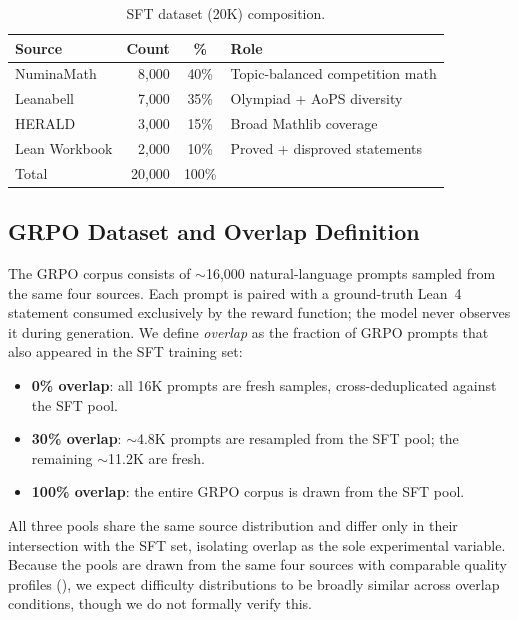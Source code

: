 \documentclass[11pt,a4paper]{article}
\begin{document}
\begin{table}[t]
\centering
\caption{SFT dataset (20K) composition.}
\label{tab:sft_mix}
\begin{tabular}{@{}lrcl@{}}
\toprule
\textbf{Source} & \textbf{Count} & \textbf{\%} & \textbf{Role} \\
\midrule
NuminaMath & 8{,}000 & 40\% & Topic-balanced competition math \\
Leanabell & 7{,}000 & 35\% & Olympiad + AoPS diversity \\
HERALD & 3{,}000 & 15\% & Broad Mathlib coverage \\
Lean Workbook & 2{,}000 & 10\% & Proved + disproved statements \\
\midrule
Total & 20{,}000 & 100\% & \\
\bottomrule
\end{tabular}
\end{table}

\subsection{GRPO Dataset and Overlap Definition}\label{sec:grpo_data}

The GRPO corpus consists of ${\sim}$16{,}000 natural-language prompts sampled from the same four sources. Each prompt is paired with a ground-truth Lean~4 statement consumed exclusively by the reward function; the model never observes it during generation. We define \emph{overlap} as the fraction of GRPO prompts that also appeared in the SFT training set:

\begin{itemize}[leftmargin=*, itemsep=2pt]
  \item \textbf{0\% overlap}: all 16K prompts are fresh samples, cross-deduplicated against the SFT pool.
  \item \textbf{30\% overlap}: ${\sim}$4.8K prompts are resampled from the SFT pool; the remaining ${\sim}$11.2K are fresh.
  \item \textbf{100\% overlap}: the entire GRPO corpus is drawn from the SFT pool.
\end{itemize}

All three pools share the same source distribution and differ only in their intersection with the SFT set, isolating overlap as the sole experimental variable. Because the pools are drawn from the same four sources with comparable quality profiles (), we expect difficulty distributions to be broadly similar across overlap conditions, though we do not formally verify this.
\end{document}
